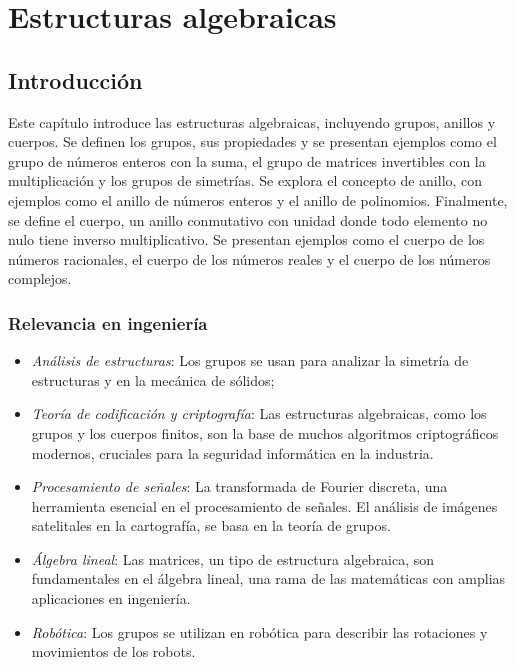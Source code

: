 \chapter{Estructuras algebraicas}

\section*{Introducción}

Este capítulo introduce las estructuras algebraicas, incluyendo grupos, anillos y cuerpos. Se definen los grupos, sus propiedades y se presentan ejemplos como el grupo de números enteros con la suma, el grupo de matrices invertibles con la multiplicación y los grupos de simetrías.
Se explora el concepto de anillo, con ejemplos como el anillo de números enteros y el anillo de polinomios. Finalmente, se define el cuerpo, un anillo conmutativo con unidad donde todo elemento no nulo tiene inverso multiplicativo. Se presentan ejemplos como el cuerpo de los números racionales, el cuerpo de los números reales y el cuerpo de los números complejos.

\subsection*{Relevancia en ingeniería}

\begin{itemize}
	\item \textit{Análisis de estructuras}: Los grupos se usan para analizar la simetría de estructuras y en la mecánica de sólidos;
	\item \textit{Teoría de codificación y criptografía}: Las estructuras algebraicas, como los grupos y los cuerpos finitos, son la base de muchos algoritmos criptográficos modernos, cruciales para la seguridad informática en la industria.
	\item \textit{Procesamiento de señales}: La transformada de Fourier discreta, una herramienta esencial en el procesamiento de señales. El análisis de imágenes satelitales en la cartografía, se basa en la teoría de grupos.
	\item \textit{Álgebra lineal}:  Las matrices, un tipo de estructura algebraica, son fundamentales en el álgebra lineal, una rama de las matemáticas con amplias aplicaciones en ingeniería.
	\item \textit{Robótica}: Los grupos se utilizan en robótica para describir las rotaciones y movimientos de los robots.
\end{itemize}

